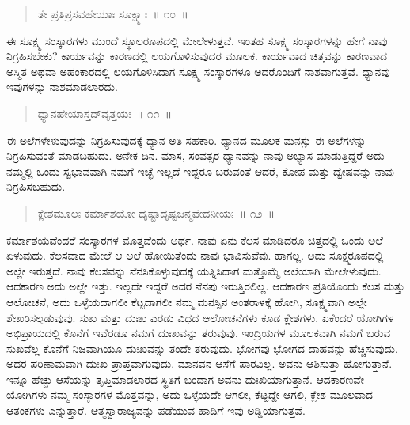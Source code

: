\vspace{-0.2cm}

\begin{verse}
ತೇ ಪ್ರತಿಪ್ರಸವಹೇಯಾಃ ಸೂಕ್ಷ್ಮಾಃ~॥ ೧೦~॥
\end{verse}

\vspace{-0.4cm}


\vskip 0.2cm 

ಈ ಸೂಕ್ಷ್ಮ ಸಂಸ್ಕಾರಗಳು ಮುಂದೆ ಸ್ಥೂಲರೂಪದಲ್ಲಿ ಮೇಲೇಳುತ್ತವೆ. ಇಂತಹ ಸೂಕ್ಷ್ಮ ಸಂಸ್ಕಾರಗಳನ್ನು ಹೇಗೆ ನಾವು ನಿಗ್ರಹಿಸಬೇಕು? ಕಾರ್ಯವನ್ನು ಕಾರಣದಲ್ಲಿ ಲಯಗೊಳಿಸುವುದರ ಮೂಲಕ. ಕಾರ್ಯವಾದ ಚಿತ್ತವನ್ನು ಕಾರಣವಾದ ಅಸ್ಮಿತ ಅಥವಾ ಅಹಂಕಾರದಲ್ಲಿ ಲಯಗೊಳಿಸಿದಾಗ ಸೂಕ್ಷ್ಮ ಸಂಸ್ಕಾರಗಳೂ ಅದರೊಂದಿಗೆ ನಾಶವಾಗುತ್ತವೆ. ಧ್ಯಾನವು ಇವುಗಳನ್ನು ನಾಶಮಾಡಲಾರದು. 

\vspace{-0.2cm}

\begin{verse}
ಧ್ಯಾನಹೇಯಾಸ್ತದ್​ವೃತ್ತಯಃ~॥ ೧೧~॥
\end{verse}

\vspace{-0.4cm}


\vskip 0.2cm 

ಈ ಅಲೆಗಳೇಳುವುದನ್ನು ನಿಗ್ರಹಿಸುವುದಕ್ಕೆ ಧ್ಯಾನ ಅತಿ ಸಹಕಾರಿ. ಧ್ಯಾನದ ಮೂಲಕ ಮನಸ್ಸು ಈ ಅಲೆಗಳನ್ನು ನಿಗ್ರಹಿಸುವಂತೆ ಮಾಡಬಹುದು. ಅನೇಕ ದಿನ. ಮಾಸ, ಸಂವತ್ಸರ ಧ್ಯಾನವನ್ನು ನಾವು ಅಭ್ಯಾಸ ಮಾಡುತ್ತಿದ್ದರೆ ಅದು ನಮ್ಮಲ್ಲಿ ಒಂದು ಸ್ವಭಾವವಾಗಿ ನಮಗೆ ಇಚ್ಛೆ ಇಲ್ಲದೆ ಇದ್ದರೂ ಬರುವಂತೆ ಆದರೆ, ಕೋಪ ಮತ್ತು ದ್ವೇಷವನ್ನು ನಾವು ನಿಗ್ರಹಿಸಬಹುದು. 

\vspace{-0.2cm}

\begin{verse}
ಕ್ಲೇಶಮೂಲಃ ಕರ್ಮಾಶಯೋ ದೃಷ್ಟಾದೃಷ್ಟಜನ್ಮವೇದನೀಯಃ~॥ ೧೨~॥
\end{verse}

\vspace{-0.4cm}


\vskip 0.2cm 

ಕರ್ಮಾಶಯವೆಂದರೆ ಸಂಸ್ಕಾರಗಳ ಮೊತ್ತವೆಂದು ಅರ್ಥ. ನಾವು ಏನು ಕೆಲಸ ಮಾಡಿದರೂ ಚಿತ್ತದಲ್ಲಿ ಒಂದು ಅಲೆ ಏಳುವುದು. ಕೆಲಸವಾದ ಮೇಲೆ ಆ ಅಲೆ ಹೋಯಿತೆಂದು ನಾವು ಭಾವಿಸುವೆವು. ಹಾಗಲ್ಲ. ಅದು ಸೂಕ್ಷ್ಮರೂಪದಲ್ಲಿ ಅಲ್ಲೇ ಇರುತ್ತದೆ. ನಾವು ಕೆಲಸವನ್ನು ನೆನಸಿಕೊಳ್ಳುವುದಕ್ಕೆ ಯತ್ನಿಸಿದಾಗ ಮತ್ತೊಮ್ಮೆ ಅಲೆಯಾಗಿ ಮೇಲೇಳುವುದು. ಆದಕಾರಣ ಅದು ಅಲ್ಲೇ ಇತ್ತು. ಇಲ್ಲದೇ ಇದ್ದರೆ ಅದರ ನೆನಪು ಇರುತ್ತಿರಲಿಲ್ಲ. ಆದಕಾರಣ ಪ್ರತಿಯೊಂದು ಕೆಲಸ ಮತ್ತು ಆಲೋಚನೆ, ಅದು ಒಳ್ಳೆಯದಾಗಲೀ ಕೆಟ್ಟದಾಗಲೀ ನಮ್ಮ ಮನಸ್ಸಿನ ಅಂತರಾಳಕ್ಕೆ ಹೋಗಿ, ಸೂಕ್ಷ್ಮವಾಗಿ ಅಲ್ಲೇ ಶೇಖರಿಸಲ್ಪಡುವುವು. ಸುಖ ಮತ್ತು ದುಃಖ ಎರಡು ವಿಧದ ಆಲೋಚನೆಗಳು ಕೂಡ ಕ್ಲೇಶಗಳು. ಏಕೆಂದರೆ ಯೋಗಿಗಳ ಅಭಿಪ್ರಾಯದಲ್ಲಿ ಕೊನೆಗೆ ಇವೆರಡೂ ನಮಗೆ ದುಃಖವನ್ನು ತರುವುವು. ಇಂದ್ರಿಯಗಳ ಮೂಲಕವಾಗಿ ನಮಗೆ ಬರುವ ಸುಖವೆಲ್ಲ ಕೊನೆಗೆ ನಿಜವಾಗಿಯೂ ದುಃಖವನ್ನು ತಂದೇ ತರುವುದು. ಭೋಗವು ಭೋಗದ ದಾಹವನ್ನು ಹೆಚ್ಚಿಸುವುದು. ಅದರ ಪರಿಣಾಮವಾಗಿ ದುಃಖ ಪ್ರಾಪ್ತವಾಗುವುದು. ಮಾನವನ ಆಸೆಗೆ ಪಾರವಿಲ್ಲ. ಅವನು ಆಶಿಸುತ್ತಾ ಹೋಗುತ್ತಾನೆ. ಇನ್ನೂ ಹೆಚ್ಚು ಆಸೆಯನ್ನು ತೃಪ್ತಿಮಾಡಲಾರದ ಸ್ಥಿತಿಗೆ ಬಂದಾಗ ಅವನು ದುಃಖಿಯಾಗುತ್ತಾನೆ. ಆದಕಾರಣವೇ ಯೋಗಿಗಳು ನಮ್ಮ ಸಂಸ್ಕಾರಗಳ ಮೊತ್ತವನ್ನು, ಅದು ಒಳ್ಳೆಯದೇ ಆಗಲೀ, ಕೆಟ್ಟದ್ದೇ ಆಗಲಿ, ಕ್ಲೇಶ ಮೂಲವಾದ ಆತಂಕಗಳು ಎನ್ನುತ್ತಾರೆ. ಆತ್ಮಸ್ವಾರಾಜ್ಯವನ್ನು ಪಡೆಯುವ ಹಾದಿಗೆ ಇವು ಅಡ್ಡಿಯಾಗುತ್ತವೆ. 

